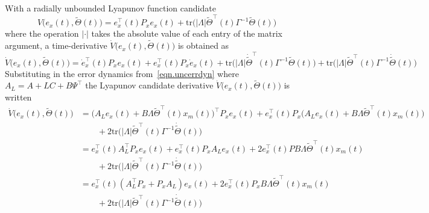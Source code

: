 \begin{proof-dan}
  With a radially unbounded Lyapunov function candidate
  \begin{equation}
    \label{eqn.lyapfunction}
    V\bigr(e_{x}(t),\widetilde{\Theta}(t)\bigr) = e_{x}^{\top}(t)P_{x}e_{x}(t)+\text{tr}\bigr(|\Lambda|\widetilde{\Theta}^{\top}(t)\Gamma^{-1}\widetilde{\Theta}(t)\bigr)
  \end{equation}
  where the operation $|\cdot|$ takes the absolute value of each entry of the matrix argument, a time-derivative $\dot{V}\bigr(e_{x}(t),\widetilde{\Theta}(t)\bigr)$ is obtained as
  \begin{equation*}
    \dot{V}\bigr(e_{x}(t),\widetilde{\Theta}(t)\bigr) = \dot{e}_{x}^{\top}(t)P_{x}e_{x}(t)+e_{x}^{\top}(t)P_{x}\dot{e}_{x}(t)+\text{tr}\bigr(|\Lambda|\dot{\widetilde{\Theta}}^{\top}(t)\Gamma^{-1}\widetilde{\Theta}(t)\bigr)+\text{tr}\bigr(|\Lambda|\widetilde{\Theta}^{\top}(t)\Gamma^{-1}\dot{\widetilde{\Theta}}(t)\bigr)
  \end{equation*}
  Substituting in the error dynamics from\ \eqref{eqn.uncerrdyn} where $A_{L} = A + LC + B\Psi^{\top}$ the Lyapunov candidate derivative $\dot{V}\bigr(e_{x}(t),\widetilde{\Theta}(t)\bigr)$ is written
  \begin{equation*}
    \begin{split}
      \dot{V}\bigr(e_{x}(t),\widetilde{\Theta}(t)\bigr)
      &=
      \bigr(A_{L}e_{x}(t)+B\Lambda\widetilde{\Theta}^{\top}(t)x_{m}(t)\bigr)^{\top}P_{x}e_{x}(t)+e_{x}^{\top}(t)P_{x}\bigr(A_{L}e_{x}(t)+B\Lambda\widetilde{\Theta}^{\top}(t)x_{m}(t)\bigr) \\
      & \qquad + 2\text{tr}\bigr(|\Lambda|\widetilde{\Theta}^{\top}(t)\Gamma^{-1}\dot{\widetilde{\Theta}}(t)\bigr) \\
      &=
      e_{x}^{\top}(t)A_{L}^{\top}P_{x}e_{x}(t) + e_{x}^{\top}(t)P_{x}A_{L}e_{x}(t)+2e_{x}^{\top}(t)PB\Lambda\widetilde{\Theta}^{\top}(t)x_{m}(t) \\
      & \qquad + 2\text{tr}\bigr(|\Lambda|\widetilde{\Theta}^{\top}(t)\Gamma^{-1}\dot{\widetilde{\Theta}}(t)\bigr) \\
      &=
      e_{x}^{\top}(t)(A_{L}^{\top}P_{x}+P_{x}A_{L})e_{x}(t) + 2e_{x}^{\top}(t)P_{x}B\Lambda\widetilde{\Theta}^{\top}(t)x_{m}(t) \\
      & \qquad + 2\text{tr}\bigr(|\Lambda|\widetilde{\Theta}^{\top}(t)\Gamma^{-1}\dot{\widetilde{\Theta}}(t)\bigr) \\
    \end{split}
  \end{equation*}

\end{proof-dan}
